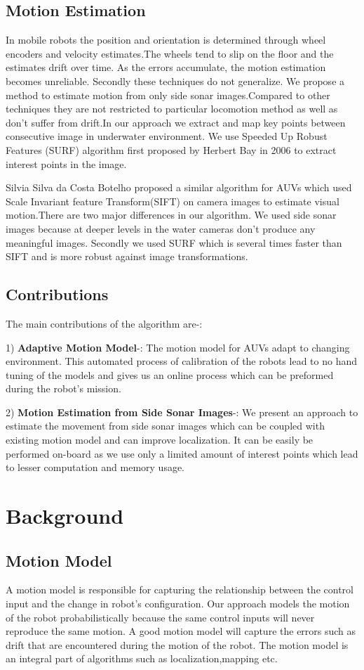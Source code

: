 \documentclass[12pt]{dalcsthesis}
\begin{document}
\section{Motion Estimation}
In mobile robots the position and orientation is determined through wheel encoders and velocity estimates.The wheels tend to slip on the floor and the estimates drift over time. As the errors accumulate, the motion estimation becomes unreliable. Secondly these techniques do not generalize. 
We propose a method to estimate motion from only side sonar images.Compared to other techniques they are not restricted to particular locomotion method as well as don't suffer from drift.In our approach we extract and map key points between consecutive image in underwater environment. We use Speeded Up Robust Features (SURF) algorithm first proposed by Herbert Bay in 2006 to extract interest points in the image. 

Silvia Silva da Costa Botelho proposed a similar algorithm for AUVs which used Scale Invariant feature Transform(SIFT) on camera images to estimate visual motion.There are two major differences in our algorithm. We used side sonar images because at deeper levels in the water cameras don't produce any meaningful images. Secondly we used SURF which is several times faster than SIFT and is more robust against image transformations.

\section{Contributions}
The main contributions of the algorithm are-:

1) \textbf{Adaptive Motion Model}-: The motion model for AUVs adapt to changing environment. This automated process of calibration of the robots lead to no hand tuning of the models and gives us an online process which can be preformed during the robot's mission.  

2) \textbf{Motion Estimation from Side Sonar Images}-: We present an approach to estimate the movement from side sonar images which can be coupled with existing motion model and can improve localization. It can be easily be performed on-board as we use only a limited amount of interest points which lead to lesser computation and memory usage. 
\chapter{Background}
\section{Motion Model}
A motion model is responsible for capturing the relationship between
the control input and the change in robot's configuration. Our approach
models the motion of the robot probabilistically because the same
control inputs will never reproduce the same motion. A good motion
model will capture the errors such as drift that are encountered during
the motion of the robot. The motion model is an integral part of algorithms
such as localization,mapping etc. 
\end{document}
